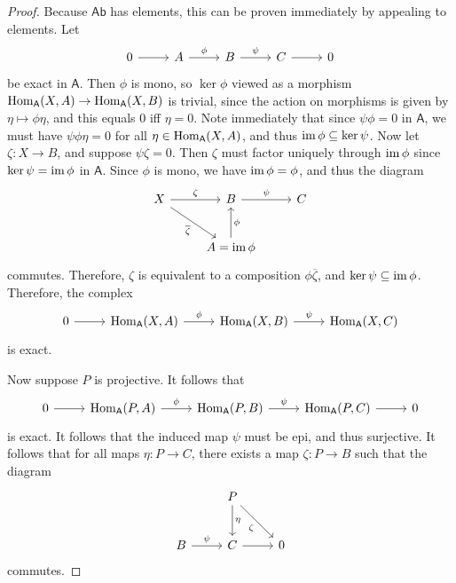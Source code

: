 \begin{proof}
	Because $\mathsf{Ab} $ has elements, this can be proven immediately by appealing to elements. Let
	\[\begin{tikzcd}[row sep = 2.5em, column sep = 2.5em]
		0\ar[r]&A\ar[r, "\phi "]&B\ar[r, "\psi "]&C\ar[r]&0
	\end{tikzcd}\]
	be exact in $\mathsf{A} $. Then $\phi $ is mono, so $\ker \phi $ viewed as a morphism $\operatorname{Hom}_{\mathsf{A} }(X, A) \to \operatorname{Hom}_{\mathsf{A} }(X, B) $ is trivial, since the action on morphisms is given by $\eta \mapsto \phi \eta $, and this equals $0$ iff $\eta =0$. Note immediately that since $\psi \phi =0$ in $\mathsf{A} $, we must have $\psi \phi \eta =0$ for all $\eta \in \operatorname{Hom}_{\mathsf{A} }(X, A) $, and thus $\operatorname{im} \phi \subseteq \ker \psi $. Now let $\zeta : X \to B$, and suppose $\psi \zeta =0$. Then $\zeta $ must factor uniquely through $\operatorname{im} \phi $ since $\ker \psi =\operatorname{im} \phi $ in $\mathsf{A} $. Since $\phi $ is mono, we have $\operatorname{im} \phi =\phi $, and thus the diagram
	\[\begin{tikzcd}[row sep = 2.5em, column sep = 2.5em]
		X\ar[r, "\zeta "]\ar[dr, "\overline{\zeta }"']&B\ar[r, "\psi "]&C\\
						  &A=\im \phi \ar[u, "\phi "']
	\end{tikzcd}\]
	commutes. Therefore, $\zeta $ is equivalent to a composition $\phi \overline{\zeta } $, and $\ker \psi \subseteq \operatorname{im} \phi $. Therefore, the complex
	\[\begin{tikzcd}[row sep = 2.5em, column sep = 2.5em]
		0\ar[r]&\Hom_{\mathsf{A} }(X, A) \ar[r, "\phi "]&\Hom_{\mathsf{A} }(X, B) \ar[r, "\psi "]&\Hom_{\mathsf{A} }(X, C) 
	\end{tikzcd}\]
	is exact.

	Now suppose $P$ is projective. It follows that
	\[\begin{tikzcd}[row sep = 2.5em, column sep = 2.5em]
		0\ar[r]&\Hom_{\mathsf{A} }(P, A) \ar[r, "\phi "]&\Hom_{\mathsf{A} }(P, B) \ar[r, "\psi "]&\Hom_{\mathsf{A} }(P, C) \ar[r]&0
	\end{tikzcd}\]
	is exact. It follows that the induced map $\psi $ must be epi, and thus surjective. It follows that for all maps $\eta :P\to C$, there exists a map $\zeta :P\to B$ such that the diagram
	\[\begin{tikzcd}[row sep = 2.5em, column sep = 2.5em]
		&P\ar[dr, "\zeta "']\ar[d, "\eta "]\\
		B\ar[r, "\psi "]&C\ar[r]&0
	\end{tikzcd}\]
	commutes.
\end{proof}


